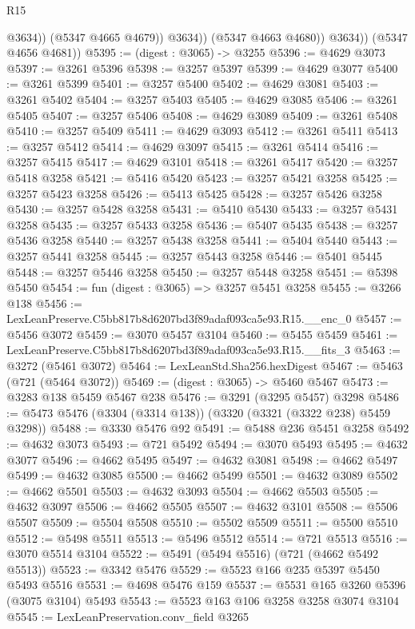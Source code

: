 \begin{lexlean}{R15}
\begin{coremodule}
                      @3634))
                  (@5347 @4665 @4679))
                @3634))
            (@5347 @4663 @4680))
          @3634))
      (@5347 @4656 @4681))
@5395 := (digest : @3065) -> @3255
@5396 := @4629 @3073
@5397 := @3261 @5396
@5398 := @3257 @5397
@5399 := @4629 @3077
@5400 := @3261 @5399
@5401 := @3257 @5400
@5402 := @4629 @3081
@5403 := @3261 @5402
@5404 := @3257 @5403
@5405 := @4629 @3085
@5406 := @3261 @5405
@5407 := @3257 @5406
@5408 := @4629 @3089
@5409 := @3261 @5408
@5410 := @3257 @5409
@5411 := @4629 @3093
@5412 := @3261 @5411
@5413 := @3257 @5412
@5414 := @4629 @3097
@5415 := @3261 @5414
@5416 := @3257 @5415
@5417 := @4629 @3101
@5418 := @3261 @5417
@5420 := @3257 @5418 @3258
@5421 := @5416 @5420
@5423 := @3257 @5421 @3258
@5425 := @3257 @5423 @3258
@5426 := @5413 @5425
@5428 := @3257 @5426 @3258
@5430 := @3257 @5428 @3258
@5431 := @5410 @5430
@5433 := @3257 @5431 @3258
@5435 := @3257 @5433 @3258
@5436 := @5407 @5435
@5438 := @3257 @5436 @3258
@5440 := @3257 @5438 @3258
@5441 := @5404 @5440
@5443 := @3257 @5441 @3258
@5445 := @3257 @5443 @3258
@5446 := @5401 @5445
@5448 := @3257 @5446 @3258
@5450 := @3257 @5448 @3258
@5451 := @5398 @5450
@5454 := fun (digest : @3065) => @3257 @5451 @3258
@5455 := @3266 @138
@5456 := LexLeanPreserve.C5bb817b8d6207bd3f89adaf093ca5e93.R15.__enc_0
@5457 := @5456 @3072
@5459 := @3070 @5457 @3104
@5460 := @5455 @5459
@5461 := LexLeanPreserve.C5bb817b8d6207bd3f89adaf093ca5e93.R15.__fits_3
@5463 := @3272 (@5461 @3072)
@5464 := LexLeanStd.Sha256.hexDigest
@5467 := @5463 (@721 (@5464 @3072))
@5469 := (digest : @3065) -> @5460 @5467
@5473 := @3283 @138 @5459 @5467 @238
@5476 := @3291 (@3295 @5457) @3298
@5486 := @5473 @5476 (@3304 (@3314 @138)) (@3320 (@3321 (@3322 @238) @5459 @3298))
@5488 := @3330 @5476 @92
@5491 := @5488 @236 @5451 @3258
@5492 := @4632 @3073
@5493 := @721 @5492
@5494 := @3070 @5493
@5495 := @4632 @3077
@5496 := @4662 @5495
@5497 := @4632 @3081
@5498 := @4662 @5497
@5499 := @4632 @3085
@5500 := @4662 @5499
@5501 := @4632 @3089
@5502 := @4662 @5501
@5503 := @4632 @3093
@5504 := @4662 @5503
@5505 := @4632 @3097
@5506 := @4662 @5505
@5507 := @4632 @3101
@5508 := @5506 @5507
@5509 := @5504 @5508
@5510 := @5502 @5509
@5511 := @5500 @5510
@5512 := @5498 @5511
@5513 := @5496 @5512
@5514 := @721 @5513
@5516 := @3070 @5514 @3104
@5522 := @5491 (@5494 @5516) (@721 (@4662 @5492 @5513))
@5523 := @3342 @5476
@5529 := @5523 @166 @235 @5397 @5450 @5493 @5516
@5531 := @4698 @5476 @159
@5537 := @5531 @165 @3260 @5396 (@3075 @3104) @5493
@5543 := @5523 @163 @106 @3258 @3258 @3074 @3104
@5545 := LexLeanPreservation.conv_field @3265

\end{coremodule}
\end{lexlean}
